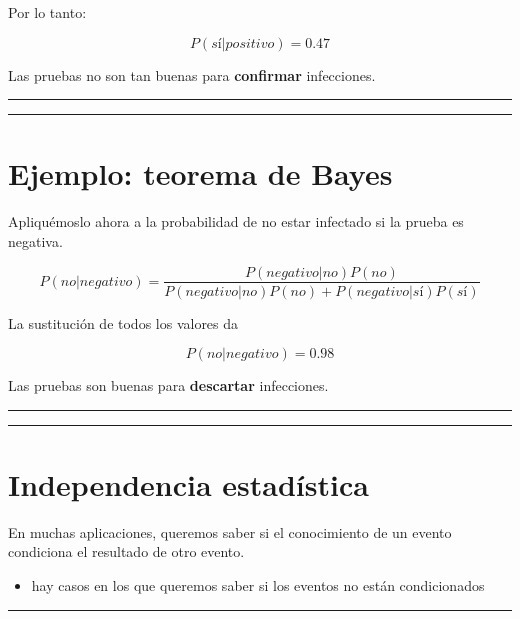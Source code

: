 \documentclass[
]{book}
\providecommand{\tightlist}{%
  \setlength{\itemsep}{0pt}\setlength{\parskip}{0pt}}
\begin{document}
Por lo tanto:

\[P(sí|positivo)=0.47\]

Las pruebas no son tan buenas para \textbf{confirmar} infecciones.

\begin{center}\rule{0.5\linewidth}{0.5pt}\end{center}

\begin{center}\rule{0.5\linewidth}{0.5pt}\end{center}

\hypertarget{ejemplo-teorema-de-bayes-1}{%
\section{Ejemplo: teorema de Bayes}\label{ejemplo-teorema-de-bayes-1}}

Apliquémoslo ahora a la probabilidad de no estar infectado si la prueba es negativa.

\[P(no|negativo) = \frac{P(negativo|no) P(no)}{P(negativo|no) P(no)+P(negativo|sí)P(sí)}\]

La sustitución de todos los valores da

\[P(no|negativo)=0.98\]

Las pruebas son buenas para \textbf{descartar} infecciones.

\begin{center}\rule{0.5\linewidth}{0.5pt}\end{center}

\begin{center}\rule{0.5\linewidth}{0.5pt}\end{center}

\hypertarget{independencia-estaduxedstica}{%
\section{Independencia estadística}\label{independencia-estaduxedstica}}

En muchas aplicaciones, queremos saber si el conocimiento de un evento condiciona el resultado de otro evento.

\begin{itemize}
\tightlist
\item
  hay casos en los que queremos saber si los eventos no están condicionados
\end{itemize}

\begin{center}\rule{0.5\linewidth}{0.5pt}\end{center}
\end{document}
